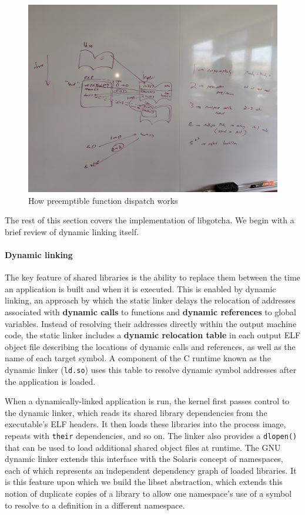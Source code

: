 \begin{figure}
\includegraphics[width=\columnwidth]{figs/calltree}
\caption{How preemptible function dispatch works}
\label{fig:callwhitelist}
\end{figure}

The rest of this section covers the implementation of libgotcha.  We begin with a
brief review of dynamic linking itself.

\paragraph{Dynamic linking}

The key feature of shared libraries is the ability to replace them between the time
an
application is built and when it is executed.  This is enabled by dynamic linking, an
approach by which the static linker delays the relocation of addresses associated
with \textbf{dynamic calls} to functions and \textbf{dynamic references} to global
variables.  Instead of resolving their addresses directly within the output machine
code, the static linker includes a
\textbf{dynamic relocation table} in each output ELF object file describing the
locations of dynamic calls and references, as well as the name of each target symbol.
A component of the C runtime known as the dynamic linker (\texttt{ld.so}) uses this
table to resolve dynamic symbol addresses after the application is loaded.

When a dynamically-linked application is run, the kernel first passes control to the
dynamic linker, which reads its shared library dependencies from the executable's ELF
headers.  It then loads these libraries into the process image, repeats with
\texttt{their} dependencies, and so on.  The linker also provides a \texttt{dlopen()}
that can be used to load additional shared object files at runtime.  The GNU dynamic
linker extends this interface with the Solaris concept of namespaces, each of which
represents an independent dependency graph of loaded libraries.  It is this feature
upon which we build the libset abstraction, which extends this notion of duplicate
copies of a library to allow one namespace's use of a symbol to resolve to a
definition in a different namespace.

